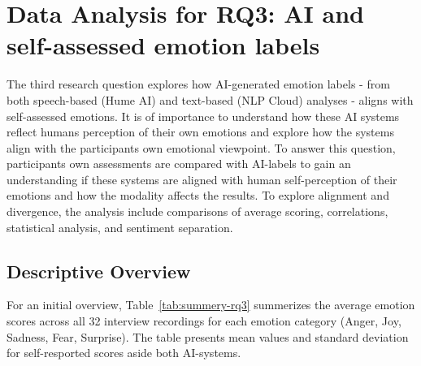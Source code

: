 \section{Data Analysis for RQ3: AI and self-assessed emotion labels}

The third research question explores how AI-generated emotion labels - from both speech-based (Hume AI) and text-based (NLP Cloud) 
analyses - aligns with self-assessed emotions. It is of importance to understand how these AI systems reflect humans perception of 
their own emotions and explore how the systems align with the participants own emotional viewpoint.  
To answer this question, participants own assessments are compared with AI-labels to gain an understanding if these systems are aligned with human self-perception of their emotions and how the modality affects the results. 
To explore alignment and divergence, the analysis include comparisons of average scoring, correlations, statistical analysis, and sentiment separation.  
\subsection{Descriptive Overview}

For an initial overview, Table~\ref{tab:summery-rq3} summerizes the average emotion scores across all 32 interview recordings 
for each emotion category (Anger, Joy, Sadness, Fear, Surprise). The table presents mean values and standard deviation for self-resported scores 
aside both AI-systems.

